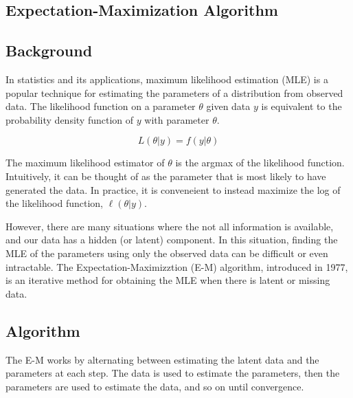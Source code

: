 \documentclass[14pt]{article}
\begin{document}
\begin{center}
\section*{Expectation-Maximization Algorithm}

\subsection*{Background}
\end{center}

In statistics and its applications, maximum likelihood estimation (MLE) is a popular technique for estimating the parameters of a distribution from observed data. The likelihood function on a parameter $\theta$ given data $y$ is equivalent to the probability density function of $y$ with parameter $\theta$.

$$L(\theta|y) = f(y|\theta)$$

The maximum likelihood estimator of $\theta$ is the argmax of the likelihood function.  Intuitively, it can be thought of as the parameter that is most likely to have generated the data.  In practice, it is conveneient to instead maximize the log of the likelihood function, $\ell(\theta|y)$.

However, there are many situations where the not all information is available, and our data has a hidden (or latent) component.  In this situation, finding the MLE of the parameters using only the observed data can be difficult or even intractable.  The Expectation-Maximizztion (E-M) algorithm, introduced in 1977, is an iterative method for obtaining the MLE when there is latent or missing data.

\begin{center}
\subsection*{Algorithm}
\end{center}

The E-M works by alternating between estimating the latent data and the parameters at each step.  The data is used to estimate the parameters, then the parameters are used to estimate the data, and so on until convergence.
\end{document}
